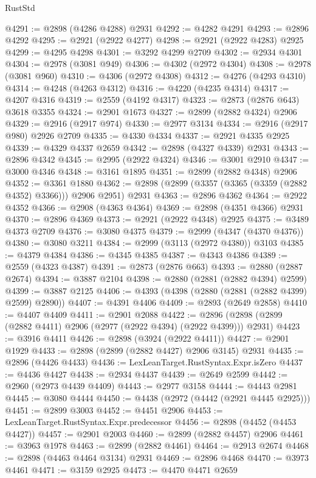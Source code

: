 \begin{lexlean}{RustStd}
\begin{coremodule}
@4291 := @2898 (@4286 @4288) @2931
@4292 := @4282 @4291
@4293 := @2896 @4292
@4295 := @2921 (@2922 @4277)
@4298 := @2921 (@2922 @4283) @2925
@4299 := @4295 @4298
@4301 := @3292 @4299 @2709
@4302 := @2934 @4301
@4304 := @2978 (@3081 @949)
@4306 := @4302 (@2972 @4304)
@4308 := @2978 (@3081 @960)
@4310 := @4306 (@2972 @4308)
@4312 := @4276 (@4293 @4310)
@4314 := @4248 (@4263 @4312)
@4316 := @4220 (@4235 @4314)
@4317 := @4207 @4316
@4319 := @2559 (@4192 @4317)
@4323 := @2873 (@2876 @643) @3618 @3355
@4324 := @2901 @1673
@4327 := @2899 (@2882 @4324) @2906
@4329 := @2916 (@2917 @974)
@4330 := @2977 @3134
@4334 := @2916 (@2917 @980) @2926 @2709
@4335 := @4330 @4334
@4337 := @2921 @4335 @2925
@4339 := @4329 @4337 @2659
@4342 := @2898 (@4327 @4339) @2931
@4343 := @2896 @4342
@4345 := @2995 (@2922 @4324)
@4346 := @3001 @2910
@4347 := @3000 @4346
@4348 := @3161 @1895
@4351 := @2899 (@2882 @4348) @2906
@4352 := @3361 @1880
@4362 := @2898 (@2899 (@3357 (@3365 (@3359 (@2882 @4352) @3366))) @2906 @2951) @2931
@4363 := @2896 @4362
@4364 := @2922 @4352
@4366 := @2908 (@4363 @4364)
@4369 := @2898 (@4351 @4366) @2931
@4370 := @2896 @4369
@4373 := @2921 (@2922 @4348) @2925
@4375 := @3489 @4373 @2709
@4376 := @3080 @4375
@4379 := @2999 (@4347 (@4370 @4376))
@4380 := @3080 @3211
@4384 := @2999 (@3113 (@2972 @4380)) @3103
@4385 := @4379 @4384
@4386 := @4345 @4385
@4387 := @4343 @4386
@4389 := @2559 (@4323 @4387)
@4391 := @2873 (@2876 @663)
@4393 := @2880 (@2887 @2674)
@4394 := @3887 @2104
@4398 := @2880 (@2881 (@2882 @4394) @2599)
@4399 := @3887 @2125
@4406 := @4393 (@4398 (@2880 (@2881 (@2882 @4399) @2599) @2890))
@4407 := @4391 @4406
@4409 := @2893 (@2649 @2858)
@4410 := @4407 @4409
@4411 := @2901 @2088
@4422 := @2896 (@2898 (@2899 (@2882 @4411) @2906 (@2977 (@2922 @4394) (@2922 @4399))) @2931)
@4423 := @3916 @4411
@4426 := @2898 (@3924 (@2922 @4411))
@4427 := @2901 @1929
@4433 := @2898 (@2899 (@2882 @4427) @2906 @3145) @2931
@4435 := @2896 (@4426 @4433)
@4436 := LexLeanTarget.RustSyntax.Expr.isZero
@4437 := @4436 @4427
@4438 := @2934 @4437
@4439 := @2649 @2599
@4442 := @2960 (@2973 @4439 @4409)
@4443 := @2977 @3158
@4444 := @4443 @2981
@4445 := @3080 @4444
@4450 := @4438 (@2972 (@4442 (@2921 @4445 @2925)))
@4451 := @2899 @3003
@4452 := @4451 @2906
@4453 := LexLeanTarget.RustSyntax.Expr.predecessor
@4456 := @2898 (@4452 (@4453 @4427))
@4457 := @2901 @2003
@4460 := @2899 (@2882 @4457) @2906
@4461 := @3963 @1978
@4463 := @2899 (@2882 @4461)
@4464 := @2913 @2674
@4468 := @2898 (@4463 @4464 @3134) @2931
@4469 := @2896 @4468
@4470 := @3973 @4461
@4471 := @3159 @2925
@4473 := @4470 @4471 @2659

\end{coremodule}
\end{lexlean}
